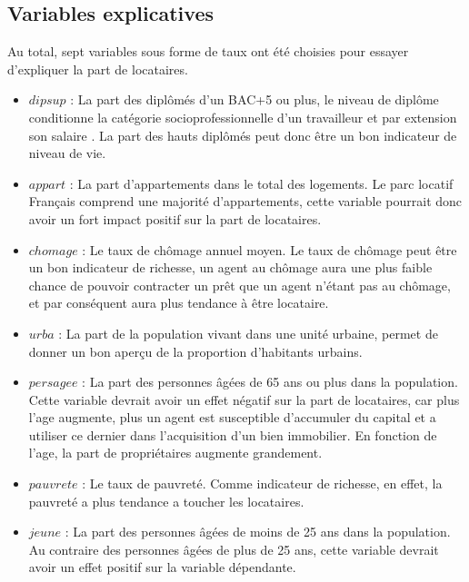 \documentclass{article}
\begin{document}
\subsection{Variables explicatives}
Au total, sept variables sous forme de taux ont été choisies pour essayer d'expliquer la part de locataires.
\begin{itemize}
    \item $dipsup$ : La part des diplômés d'un BAC+5 ou plus, le niveau de diplôme conditionne la catégorie socioprofessionnelle d'un travailleur et par extension son salaire
        . La part des hauts diplômés peut donc être un bon indicateur de niveau de vie.
    \item $appart$ : La part d'appartements dans le total des logements. Le parc locatif Français comprend une majorité d'appartements\cite{part_appart}, cette variable pourrait donc
        avoir un fort impact positif sur la part de locataires.
    \item $chomage$ : Le taux de chômage annuel moyen. Le taux de chômage peut être un bon indicateur de richesse, un agent au chômage aura une plus faible chance de pouvoir contracter
        un prêt que un agent n'étant pas au chômage, et par conséquent aura plus tendance à être locataire.
    \item $urba$ : La part de la population vivant dans une unité urbaine, permet de donner un bon aperçu de la proportion d'habitants urbains.
    \item $persagee$ : La part des personnes âgées de 65 ans ou plus dans la population. Cette variable devrait avoir un effet négatif sur la part de locataires, car plus l'age augmente, plus
        un agent est susceptible d'accumuler du capital et a utiliser ce dernier dans l'acquisition d'un bien immobilier. En fonction de l'age, la part de propriétaires augmente grandement.\cite{part_appart}
    \item $pauvrete$ : Le taux de pauvreté. Comme indicateur de richesse, en effet, la pauvreté a plus tendance a toucher les locataires.\cite{pauvrete_locataires}
    \item $jeune$ : La part des personnes âgées de moins de 25 ans dans la population. Au contraire des personnes âgées de plus de 25 ans, cette variable devrait avoir un effet positif sur
        la variable dépendante.
    \end{itemize}
\end{document}
